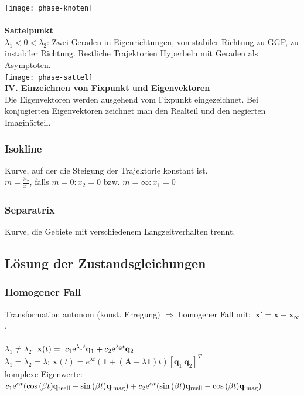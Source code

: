 \documentclass[fs, footer]{latex4ei}
\begin{document}
\begin{multicols*}{4}
\texttt{[image: phase-knoten]}\\ \\
\textbf{Sattelpunkt}\\
$\lambda_1 < 0 < \lambda_2 $: Zwei Geraden in Eigenrichtungen, von stabiler Richtung zu GGP, zu instabiler Richtung. Restliche Trajektorien Hyperbeln mit Geraden als Asymptoten.\\
\texttt{[image: phase-sattel]}\\
\textbf{IV. Einzeichnen von Fixpunkt und Eigenvektoren}\\
Die Eigenvektoren werden ausgehend vom Fixpunkt eingezeichnet. Bei konjugierten Eigenvektoren zeichnet man den Realteil und den negierten Imaginärteil.\\
\subsubsection{Isokline}
Kurve, auf der die Steigung der Trajektorie konstant ist.\\
$m = \frac{\dot{x}_2}{\dot{x}_1}$, falls $m = 0: \dot{x}_2 = 0$ bzw. $m = \infty: \dot{x}_1 = 0$
\subsubsection{Separatrix}
Kurve, die Gebiete mit verschiedenem Langzeitverhalten trennt.
\subsection{Lösung der Zustandsgleichungen}
\subsubsection{Homogener Fall}
Transformation autonom (konst. Erregung) $\Rightarrow$ homogener Fall mit: $\ \mathbf{x}' = \mathbf{x} - \mathbf{x}_\infty$.\\ \\
$\lambda_1 \neq \lambda_2$: $\mathbf{x}(t) = \ c_1\mathrm{e}^{\lambda_1 t}\mathbf{q}_1 + c_2\mathrm{e}^{\lambda_2 t}\mathbf{q}_2$\\
$\lambda_1 = \lambda_2 = \lambda$: $\mathbf{x}(t) = e^{\lambda t}(\mathbf{1} + (\mathbf{A} -\lambda \mathbf{1})t) [\mathbf{q}_1 \ \mathbf{q}_2]^T$\\
komplexe Eigenwerte: $c_1 \mathrm{e}^{\alpha t}(\cos{(\beta t)}\mathbf{q}_{\text{reell}} - \sin{(\beta t)}\mathbf{q}_{\text{imag}}) + c_2\mathrm{e}^{\alpha t}(\sin{(\beta t)}\mathbf{q}_{\text{reell}} - \cos{(\beta t)}\mathbf{q}_{\text{imag}})$\\

\end{multicols*}
\end{document}
